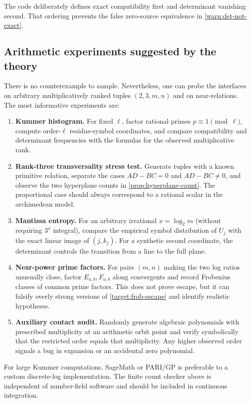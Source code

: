 \documentclass[11pt,oneside]{article}
\theoremstyle{definition}
\theoremstyle{remark}
\begin{document}
The code deliberately defines exact compatibility first and determinant
vanishing second.  That ordering prevents the false zero-source equivalence
in \cref{warn:det-not-exact}.

\subsection{Arithmetic experiments suggested by the theory}

There is no counterexample to sample.  Nevertheless, one can probe the
interfaces on arbitrary multiplicatively ranked tuples $(2,3,m,n)$ and on
near-relations.  The most informative experiments are:

\begin{enumerate}
\item \textbf{Kummer histogram.}  For fixed $\ell$, factor rational primes
$p\equiv1\pmod\ell$, compute order-$\ell$ residue-symbol coordinates, and
compare compatibility and determinant frequencies with the formulas for the
observed multiplicative rank.
\item \textbf{Rank-three transversality stress test.}  Generate tuples with a
known primitive relation, separate the cases $AD-BC=0$ and $AD-BC\ne0$, and
observe the two hyperplane counts in \cref{prop:hyperplane-count}.  The
proportional case should always correspond to a rational scalar in the
archimedean model.
\item \textbf{Mantissa entropy.}  For an arbitrary irrational
$x=\log_2 m$ (without requiring $3^x$ integral), compare the empirical
symbol distribution of $U_j$ with the exact linear image of $(j,k_j)$.  For
a synthetic second coordinate, the determinant controls the transition from
a line to the full plane.
\item \textbf{Near-power prime factors.}  For pairs $(m,n)$ making the two log
ratios unusually close, factor
$E_{a,b},F_{a,b}$ along convergents and record Frobenius classes of common
prime factors.  This does not prove escape, but it can falsify overly strong
versions of \cref{target:frob-escape} and identify realistic hypotheses.
\item \textbf{Auxiliary contact audit.}  Randomly generate algebraic
polynomials with prescribed multiplicity at an arithmetic orbit point and
verify symbolically that the restricted order equals that multiplicity.  Any
higher observed order signals a bug in expansion or an accidental zero
polynomial.
\end{enumerate}

For large Kummer computations, SageMath or PARI/GP is preferable to a custom
discrete-log implementation.  The finite count checker above is independent
of number-field software and should be included in continuous integration.
\end{document}
